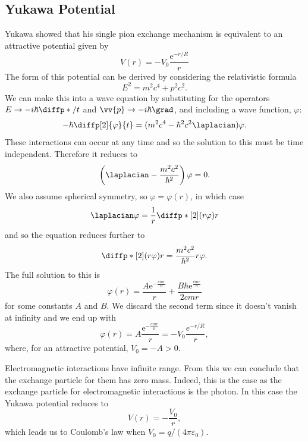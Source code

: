 \documentclass[fleqn]{NotesClass}
\newcommand{\e}{\mathrm{e}}
\begin{document}
    \subsection{Yukawa Potential}
    Yukawa showed that his single pion exchange mechanism is equivalent to an attractive potential given by
    \begin{equation}
        V(r) = -V_0 \frac{\e^{-r/R}}{r}
    \end{equation}
    The form of this potential can be derived by considering the relativistic formula
    \begin{equation}
        E^2 = m^2c^4 + p^2c^2.
    \end{equation}
    We can make this into a wave equation by substituting for the operators \(E \to -i\hbar\diffp*{}/{t}\) and \(\vv{p}\to -i\hbar\grad\), and including a wave function, \(\varphi\):
    \begin{equation}
        -\hbar\diffp[2]{\varphi}{t} = (m^2c^4 - \hbar^2 c^2\laplacian)\varphi.
    \end{equation}
    These interactions can occur at any time and so the solution to this must be time independent.
    Therefore it reduces to
    \begin{equation}
        \left( \laplacian - \frac{m^2c^2}{\hbar^2} \right)\varphi = 0.
    \end{equation}
    We also assume spherical symmetry, so \(\varphi = \varphi(r)\), in which case
    \begin{equation}
        \laplacian \varphi = \frac{1}{r}\diffp*[2]{(r\varphi)}{r}
    \end{equation}
    and so the equation reduces further to
    \begin{equation}
        \diffp*[2]{(r\varphi)}{r} = \frac{m^2c^2}{\hbar^2}r\varphi.
    \end{equation}
    The full solution to this is
    \begin{equation}
        \varphi(r) = \frac{A \e^{-\frac{cmr}{\hbar}}}{r}+\frac{B\hbar  \e^{\frac{cmr}{\hbar}}}{2cmr}
    \end{equation}
    for some constants \(A\) and \(B\).
    We discard the second term since it doesn't vanish at infinity and we end up with
    \begin{equation}
        \varphi(r) = A\frac{\e^{-\frac{cmr}{\hbar}}}{r} = -V_0\frac{e^{-r/R}}{r},
    \end{equation}
    where, for an attractive potential, \(V_0 = -A > 0\).
    
    Electromagnetic interactions have infinite range.
    From this we can conclude that the exchange particle for them has zero mass.
    Indeed, this is the case as the exchange particle for electromagnetic interactions is the photon.
    In this case the Yukawa potential reduces to
    \begin{equation}
        V(r) = -\frac{V_0}{r},
    \end{equation}
    which leads us to Coulomb's law when \(V_0 = q/(4\pi\varepsilon_0)\).
    
\end{document}
